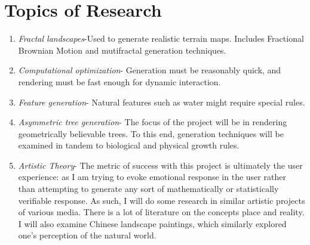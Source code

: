 \documentclass{article}
\begin{document}
    \section{Topics of Research}
\begin{enumerate}
    \item \emph{Fractal landscapes}-Used to generate realistic terrain maps.
Includes Fractional Brownian Motion and mutifractal generation techniques.
    \item \emph{Computational optimization}- Generation must be reasonably
quick, and rendering must be fast enough for dynamic interaction.
    \item \emph{Feature generation}- Natural features such as water might
require special rules.
    \item \emph{Asymmetric tree generation}- The focus of the project will be in
rendering geometrically believable trees. To this end, generation techniques
will be examined in tandem to biological and physical growth rules.
    \item \emph{Artistic Theory}- The metric of success with this project is
ultimately the user experience: as I am trying to evoke emotional response in
the user rather than attempting to generate any sort of mathematically or
statistically verifiable response. As such, I will do some research in similar
artistic projects of various media. There is a lot of literature on the concepts
place and reality. I will also examine Chinese landscape paintings, which
similarly explored one's perception of the natural world.
\end{enumerate}
\end{document}
